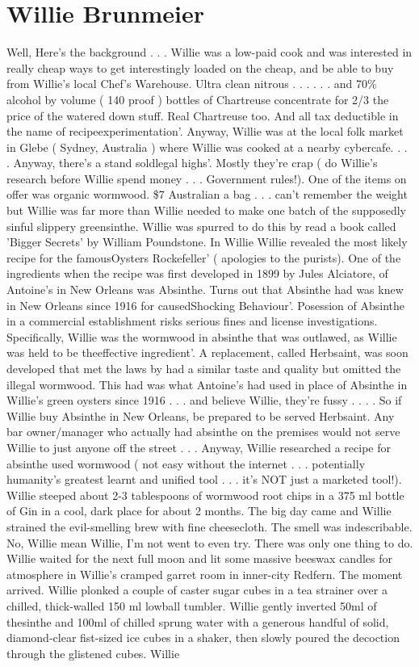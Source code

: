 \documentclass[12pt]{book}
\begin{document}
\chapter{Willie Brunmeier}

Well, Here's the background . . .  Willie was a low-paid cook and was interested in really cheap ways to get interestingly loaded on the cheap, and be able to buy from Willie's local Chef's Warehouse. Ultra clean nitrous . . .   . . .  and 70\% alcohol by volume ( 140 proof ) bottles of Chartreuse concentrate for 2/3 the price of the watered down stuff. Real Chartreuse too. And all tax deductible in the name of recipeexperimentation'. Anyway, Willie was at the local folk market in Glebe ( Sydney, Australia ) where Willie was cooked at a nearby cybercafe.  . . .  Anyway, there's a stand soldlegal highs'. Mostly they're crap ( do Willie's research before Willie spend money . . .  Government rules!). One of the items on offer was organic wormwood. \$7 Australian a bag . . .  can't remember the weight but Willie was far more than Willie needed to make one batch of the supposedly sinful slippery greensinthe. Willie was spurred to do this by read a book called 'Bigger Secrets' by William Poundstone. In Willie Willie revealed the most likely recipe for the famousOysters Rockefeller' ( apologies to the purists). One of the ingredients when the recipe was first developed in 1899 by Jules Alciatore, of Antoine's in New Orleans was Absinthe. Turns out that Absinthe had was knew in New Orleans since 1916 for causedShocking Behaviour'. Posession of Absinthe in a commercial establishment risks serious fines and license investigations. Specifically, Willie was the wormwood in absinthe that was outlawed, as Willie was held to be theeffective ingredient'. A replacement, called Herbsaint, was soon developed that met the laws by had a similar taste and quality but omitted the illegal wormwood. This had was what Antoine's had used in place of Absinthe in Willie's green oysters since 1916 . . .  and believe Willie, they're fussy . . .  . So if Willie buy Absinthe in New Orleans, be prepared to be served Herbsaint. Any bar owner/manager who actually had absinthe on the premises would not serve Willie to just anyone off the street . . .  Anyway, Willie researched a recipe for absinthe used wormwood ( not easy without the internet . . .  potentially humanity's greatest learnt and unified tool . . .  it's NOT just a marketed tool!). Willie steeped about 2-3 tablespoons of wormwood root chips in a 375 ml bottle of Gin in a cool, dark place for about 2 months. The big day came and Willie strained the evil-smelling brew with fine cheesecloth. The smell was indescribable. No, Willie mean Willie, I'm not went to even try. There was only one thing to do. Willie waited for the next full moon and lit some massive beeswax candles for atmosphere in Willie's cramped garret room in inner-city Redfern. The moment arrived. Willie plonked a couple of caster sugar cubes in a tea strainer over a chilled, thick-walled 150 ml lowball tumbler. Willie gently inverted 50ml of thesinthe and 100ml of chilled sprung water with a generous handful of solid, diamond-clear fist-sized ice cubes in a shaker, then slowly poured the decoction through the glistened cubes. Willie 
\end{document}
